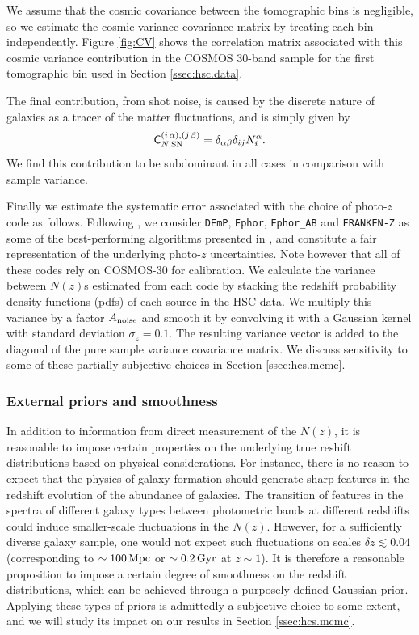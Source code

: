 \documentclass[a4paper,11pt]{article}
\begin{document}
        We assume that the cosmic covariance between the tomographic bins is negligible, so we estimate the cosmic variance covariance matrix by treating each bin independently. Figure \ref{fig:CV} shows the correlation matrix associated with this cosmic variance contribution in the COSMOS 30-band sample for the first tomographic bin used in Section \ref{ssec:hsc.data}.
        
        The final contribution, from shot noise, is caused by the discrete nature of galaxies as a tracer of the matter fluctuations, and is simply given by
        \begin{equation}\label{eq:cov_nz_shot}
          {\sf C}^{(i\,\alpha),(j\,\beta)}_{N,{\rm SN}}=\delta_{\alpha\beta}\delta_{ij}N^\alpha_i.
        \end{equation}
        We find this contribution to be subdominant in all cases in comparison with sample variance.


        Finally we estimate the systematic error associated with the choice of photo-$z$ code as follows. Following \cite{1912.08209}, we consider  {\tt DEmP}, {\tt Ephor}, {\tt Ephor\_AB} and {\tt FRANKEN-Z} as some of the best-performing algorithms presented in \cite{2018PASJ...70S...9T}, and constitute a fair representation of the underlying photo-$z$ uncertainties. Note however that all of these codes rely on COSMOS-30 for calibration. We calculate the variance between $N(z)$s estimated from each code by stacking the redshift probability density functions (pdfs) of each source in the HSC data.  We multiply this variance by a factor $A_{\rm noise}$ and smooth it by convolving it with a Gaussian kernel with standard deviation $\sigma_z=0.1$. The resulting variance vector is added to the diagonal of the pure sample variance covariance matrix. We discuss sensitivity to some of these partially subjective choices in Section \ref{ssec:hcs.mcmc}.

    \subsubsection{External priors and smoothness}\label{sssec:theory.prior.smooth}
      In addition to information from direct measurement of the $N(z)$, it is reasonable to impose certain properties on the underlying true reshift distributions based on physical considerations. For instance, there is no reason to expect that the physics of galaxy formation should generate sharp features in the redshift evolution of the abundance of galaxies. The transition of features in the spectra of different galaxy types between photometric bands at different redshifts could induce smaller-scale fluctuations in the $N(z)$. However, for a sufficiently diverse galaxy sample, one would not expect such fluctuations on scales $\delta z\lesssim0.04$ (corresponding to $\sim100\,{\rm Mpc}$ or $\sim0.2\,{\rm Gyr}$ at $z\sim1$). It is therefore a reasonable proposition to impose a certain degree of smoothness on the redshift distributions, which can be achieved through a purposely defined Gaussian prior. Applying these types of priors is admittedly a subjective choice to some extent, and we will study its impact on our results in Section \ref{ssec:hcs.mcmc}.
      
\end{document}
